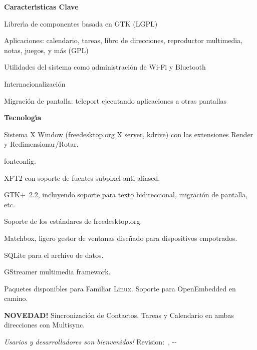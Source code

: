 {%

\smallskip
\textbf{Caracter{\'\i}sticas Clave}
\begin{compactitem}
   \item Librer{\'\i}a de componentes basada en GTK (LGPL)
   \item Aplicaciones: calendario, tareas, libro de direcciones, reproductor
     multimedia, notas, juegos, y m{\'a}s (GPL)
   \item Utilidades del sistema como administraci{\'o}n de Wi-Fi y Bluetooth
   \item Internacionalizaci{\'o}n
   \item Migraci{\'o}n de pantalla: {\guillemotright}teleport{\guillemotleft} ejecutando aplicaciones a otras
     pantallas
\end{compactitem}

\smallskip
\textbf{Tecnolog{\'\i}a}
\begin{compactitem}
   \item Sistema X Window {\texttrademark}{} (freedesktop.org X
     server, kdrive) con las extensiones Render y
     Redimensionar/Rotar.
   \item fontconfig.
   \item XFT2 con soporte de fuentes subpixel anti-aliased.
   \item GTK+~2.2, incluyendo soporte para texto bidireccional, migraci{\'o}n de pantalla,
     etc.
   \item Soporte de los est{\'a}ndares de freedesktop.org.
   \item Matchbox, ligero gestor de ventanas dise{\~n}ado para dispositivos
     empotrados.
   \item SQLite para el archivo de datos.
   \item GStreamer multimedia framework.
   \item Paquetes disponibles para Familiar Linux. Soporte para OpenEmbedded
     en camino.
	\item \textbf{{\textexclamdown}NOVEDAD!} Sincronizaci{\'o}n de Contactos, Tareas y Calendario en ambas direcciones con Multisync.
\end{compactitem}

\smallskip
\textit{{\textexclamdown}Usarios y desarrolladores son bienvenidos!}%
\hfill\tiny{Revision:~\rcsInfoRevision, \rcsInfoYear-\rcsInfoMonth-\rcsInfoDay}
}

